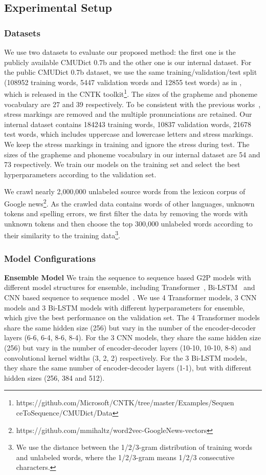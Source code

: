 \documentclass[a4paper]{article}
\begin{document}
\subsection{Experimental Setup}
\subsubsection{Datasets}
We use two datasets to evaluate our proposed method: the first one is the publicly available CMUDict 0.7b  and the other one is our internal dataset. For the public CMUDict 0.7b dataset, we use the same training/validation/test split (108952 training words, 5447 validation words and 12855 test words) as in \cite{milde2017multitask}, which is released in the CNTK toolkit\footnote{https://github.com/Microsoft/CNTK/tree/master/Examples/Sequen ceToSequence/CMUDict/Data}. The sizes of the grapheme and phoneme vocabulary are 27 and 39 respectively. To be consistent with the previous works~\cite{bisani2008joint,chae2018convolutional,milde2017multitask}, stress markings are removed and the multiple pronunciations are retained. Our internal dataset contains 184243 training words, 10837 validation words, 21678 test words, which includes uppercase and lowercase letters and stress markings. We keep the stress markings in training and ignore the stress during test. The sizes of the grapheme and phoneme vocabulary in our internal dataset are 54 and 73 respectively. We train our models on the training set and select the best hyperparameters according to the validation set.


We crawl nearly 2,000,000 unlabeled source words from the lexicon corpus of Google news\footnote{https://github.com/mmihaltz/word2vec-GoogleNews-vectors}. As the crawled data contains words of other languages, unknown tokens and spelling errors, we first filter the data by removing the words with unknown tokens and then choose the top 300,000 unlabeled words according to their similarity to the training data\footnote{We use the distance between the 1/2/3-gram distribution of training words and unlabeled words, where the 1/2/3-gram means 1/2/3 consecutive characters.}.


\subsubsection{Model Configurations}
\textbf{Ensemble Model} We train the sequence to sequence based G2P models with different model structures for ensemble, including Transformer~\cite{vaswani2017attention}, Bi-LSTM~\cite{wu2016google} and CNN based sequence to sequence model~\cite{gehring2017convolutional}. We use 4 Transformer models, 3 CNN models and 3 Bi-LSTM models with different hyperparameters for ensemble, which give the best performance on the validation set. The 4 Transformer models share the same hidden size (256) but vary in the number of the encoder-decoder layers (6-6, 6-4, 8-6, 8-4). For the 3 CNN models, they share the same hidden size (256) but vary in the number of encoder-decoder layers (10-10, 10-10, 8-8) and convolutional kernel widths (3, 2, 2) respectively. For the 3 Bi-LSTM models, they share the same number of encoder-decoder layers (1-1), but with different hidden sizes (256, 384 and 512).
\end{document}
